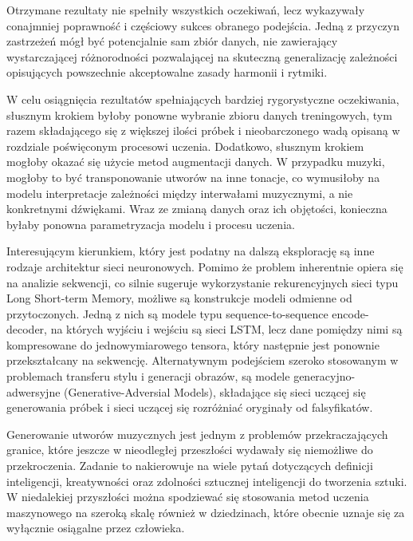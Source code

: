{    %

    Otrzymane rezultaty nie spełniły wszystkich oczekiwań, lecz wykazywały conajmniej poprawność i częściowy
    sukces obranego podejścia. Jedną z przyczyn zastrzeżeń mógł być potencjalnie sam zbiór danych, nie 
    zawierający wystarczającej różnorodności pozwalającej na skuteczną generalizację zależności opisujących 
    powszechnie akceptowalne zasady harmonii i rytmiki.

    W celu osiągnięcia rezultatów spełniających bardziej rygorystyczne oczekiwania, słusznym krokiem byłoby
    ponowne wybranie zbioru danych treningowych, tym razem składającego się z większej ilości próbek i nieobarczonego
    wadą opisaną w rozdziale poświęconym procesowi uczenia. 
    Dodatkowo, słusznym krokiem mogłoby okazać się użycie metod augmentacji danych. W przypadku muzyki, mogłoby to
    być transponowanie utworów na inne tonacje, co wymusiłoby na modelu interpretacje zależności między interwałami
    muzycznymi, a nie konkretnymi dźwiękami.
    Wraz ze zmianą danych oraz ich objętości, konieczna byłaby ponowna parametryzacja modelu i procesu uczenia.


    Interesującym kierunkiem, który jest podatny na dalszą eksplorację są inne rodzaje architektur sieci neuronowych.
    Pomimo że problem inherentnie opiera się na analizie sekwencji, co silnie sugeruje wykorzystanie rekurencyjnych 
    sieci typu Long Short-term Memory, możliwe są konstrukcje modeli odmienne od przytoczonych. Jedną z nich są modele typu 
    sequence-to-sequence encode-decoder, na których wyjściu i wejściu są sieci LSTM, lecz dane pomiędzy nimi są
    kompresowane do jednowymiarowego tensora, który następnie jest ponownie przekształcany na sekwencję. 
    Alternatywnym podejściem szeroko stosowanym w problemach transferu stylu i generacji obrazów, 
    są modele generacyjno-adwersyjne (Generative-Adversial Models), składające się sieci uczącej się generowania 
    próbek i sieci uczącej się rozróżniać oryginały od falsyfikatów.


    Generowanie utworów muzycznych jest jednym z problemów przekraczających granice, które
    jeszcze w nieodległej przeszłości wydawały się niemożliwe do przekroczenia. Zadanie to nakierowuje na wiele pytań 
    dotyczących definicji inteligencji, kreatywności oraz zdolności sztucznej inteligencji do tworzenia sztuki. 
    W niedalekiej przyszłości można spodziewać się stosowania metod uczenia maszynowego na szeroką skalę również w dziedzinach,
    które obecnie uznaje się za wyłącznie osiągalne przez człowieka. 

}
